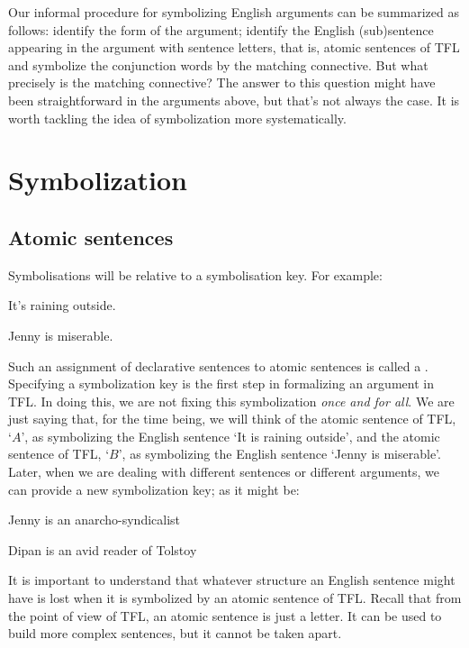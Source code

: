 Our informal procedure for symbolizing English arguments can be summarized as follows: identify the form of the argument; identify the English (sub)sentence appearing in the argument with sentence letters, that is, atomic sentences of TFL and symbolize the conjunction words by the matching connective. But what precisely is the matching connective? The answer to this question might have been straightforward in the arguments above, but that's not always the case. It is worth tackling the idea of symbolization more systematically. %

\chapter{Symbolization}
\section{Atomic sentences}

Symbolisations will be relative to a symbolisation key. For example:
\begin{ekey}
\item[A]It's raining outside.
\item[B]Jenny is miserable.
\end{ekey}
Such an assignment of declarative sentences to atomic sentences is called a . Specifying a symbolization key is the first step in formalizing an argument in TFL. In doing this, we are not fixing this symbolization \emph{once and for all}. We are just saying that, for the time being, we will think of the atomic sentence of TFL, `$A$', as symbolizing the English sentence `It is raining outside', and the atomic sentence of TFL, `$B$', as symbolizing the English sentence `Jenny is miserable'. Later, when we are dealing with different sentences or different arguments, we can provide a new symbolization key; as it might be:
	\begin{ekey}
		\item[A] Jenny is an anarcho-syndicalist
		\item[B] Dipan is an avid reader of Tolstoy
	\end{ekey}
It is important to understand that whatever structure an English sentence might have is lost when it is symbolized by an atomic sentence of TFL. Recall that from the point of view of TFL, an atomic sentence is just a letter. It can be used to build more complex sentences, but it cannot be taken apart.

